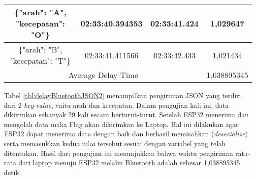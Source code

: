 \begin{longtable}{|ccc|c|}
  \multicolumn{1}{|c|}{\{"arah": "A", "kecepatan": "O"\}} & \multicolumn{1}{c|}{02:33:40.394353} & 02:33:41.424       & 1,029647    \\ \hline
  \multicolumn{1}{|c|}{\{"arah": "B", "kecepatan": "T"\}} & \multicolumn{1}{c|}{02:33:41.411566} & 02:33:42.433       & 1,021434    \\ \hline
  \multicolumn{3}{|c|}{Average Delay Time}                                                                            & 1,038895345 \\ \hline
  \end{longtable}

Tabel \ref{tbl:delayBluetoothJSON2} menampilkan pengiriman JSON yang terdiri dari 2 \emph{key}-\emph{value}, yaitu arah dan kecepatan. Dalam pengujian kali ini, data dikirimkan sebanyak 29 kali secara berturut-turut. Setelah ESP32 menerima dan mengolah data maka Flag akan dikirimkan ke Laptop. Hal ini dilakukan agar ESP32 dapat menerima data dengan baik dan berhasil memisahkan (\emph{deserialize}) serta memasukkan kedua nilai tersebut sesuai dengan variabel yang telah ditentukan. Hasil dari pengujian ini menunjukkan bahwa waktu pengiriman rata-rata dari laptop menuju ESP32 melalui Bluetooth adalah sebesar 1,038895345 detik.

